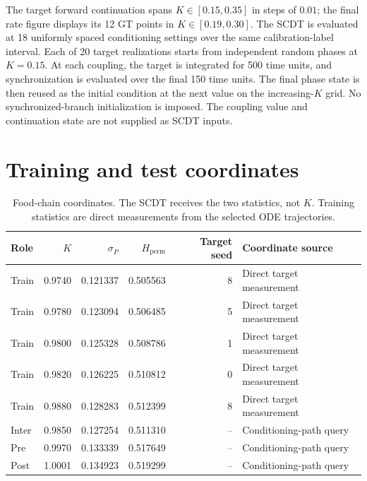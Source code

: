 \documentclass[10pt,a4paper]{article}
\begin{document}
The target forward continuation spans $K\in[0.15,0.35]$ in steps of $0.01$;
the final rate figure displays its 12 GT points in $K\in[0.19,0.30]$.
The SCDT is evaluated at 18 uniformly spaced conditioning settings over the
same calibration-label interval. Each of 20
target realizations starts from independent random phases at $K=0.15$.
At each coupling, the target is integrated for 500 time units, and synchronization is
evaluated over the final 150 time units. The final phase state is then reused as
the initial condition at the next value on the increasing-$K$ grid. No
synchronized-branch initialization is imposed. The coupling value and
continuation state are not supplied as SCDT inputs.

\section{Training and test coordinates}

\begin{table}[H]
\centering
\caption{Food-chain coordinates. The SCDT receives the two statistics, not
$K$. Training statistics are direct measurements from the selected ODE
trajectories.}
\label{tab:food-coordinates}
\small
\begin{tabular}{@{}lrrrrl@{}}
\toprule
Role & $K$ & $\sigma_P$ & $H_{\mathrm{perm}}$ & Target seed & Coordinate source \\
\midrule
Train & 0.9740 & 0.121337 & 0.505563 & 8 & Direct target measurement \\
Train & 0.9780 & 0.123094 & 0.506485 & 5 & Direct target measurement \\
Train & 0.9800 & 0.125328 & 0.508786 & 1 & Direct target measurement \\
Train & 0.9820 & 0.126225 & 0.510812 & 0 & Direct target measurement \\
Train & 0.9880 & 0.128283 & 0.512399 & 8 & Direct target measurement \\
\rowcolor{bluegray} Inter & 0.9850 & 0.127254 & 0.511310 & -- & Conditioning-path query \\
\rowcolor{bluegray} Pre & 0.9970 & 0.133339 & 0.517649 & -- & Conditioning-path query \\
\rowcolor{bluegray} Post & 1.0001 & 0.134923 & 0.519299 & -- & Conditioning-path query \\
\bottomrule
\end{tabular}
\end{table}
\end{document}
